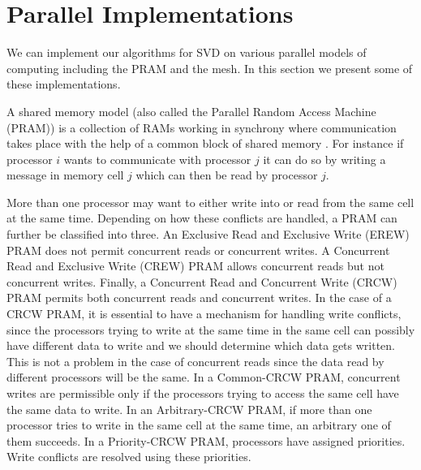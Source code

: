 
\renewcommand{\baselinestretch}{1.1}
\setlength{\topmargin}{-0.4in}
\setlength{\textwidth}{6in}
\setlength{\oddsidemargin}{0.0in}
\setlength{\textheight}{9in}

\newlength{\pagewidth}
\setlength{\pagewidth}{6in}

\newtheorem{lemma}{Lemma}[section]
\newtheorem{theorem}{Theorem}[section]
\newtheorem{example}{Example}[section]



\section{Parallel Implementations}
We can implement our algorithms for SVD on various parallel models of computing including the PRAM and the mesh.
In this section we present some of these implementations.

A shared memory model (also called the Parallel Random Access Machine (PRAM))
is a collection
of RAMs working in synchrony where communication takes place
with the help of a common block of shared memory \cite{Jaj92,HSR08}.
For instance if processor $i$ wants to communicate with processor
$j$ it can do so by writing a message in memory cell $j$
which can then be read by processor $j$.

More than one processor may want to either write into or read from the same
cell at the same time. Depending on how these conflicts are handled,
a PRAM can further be classified into three. An
Exclusive Read and Exclusive Write (EREW) PRAM does not permit concurrent
reads or concurrent writes. A Concurrent Read and Exclusive Write (CREW)
PRAM allows concurrent reads but not concurrent writes. Finally,
a Concurrent Read and Concurrent Write (CRCW) PRAM permits both concurrent
reads and concurrent writes. In the case
of a CRCW PRAM, it is essential to have a mechanism for handling
write conflicts, since the processors trying to write at the same time
in the same cell can possibly have different data to write and we should
determine which data gets written. This is not a problem in the case of
concurrent reads since the data read by different processors will be
the same. In a Common-CRCW PRAM, concurrent writes are permissible only if
the processors trying to access the same cell have the same data to write.
In an Arbitrary-CRCW PRAM, if more than one processor tries to write in the
same cell at the same time, an arbitrary one of them succeeds.
In a Priority-CRCW PRAM, processors have assigned priorities. Write conflicts
are resolved using these priorities.

